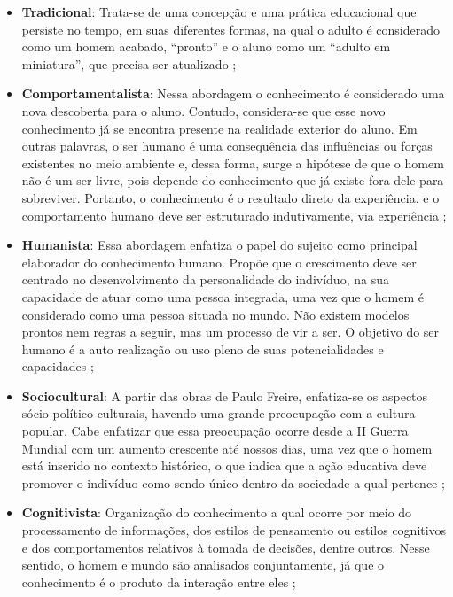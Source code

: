 \begin{itemize}
    \item \textbf{Tradicional}: Trata-se de uma concepção e uma prática educacional que persiste no tempo, em suas diferentes formas, na qual o adulto é considerado como um homem acabado, ``pronto'' e o aluno como um ``adulto em miniatura'', que precisa ser atualizado \cite{Cilli2017, Mizukami1986};
    \item \textbf{Comportamentalista}: Nessa abordagem o conhecimento é considerado uma nova descoberta para o aluno. Contudo, considera-se que esse novo conhecimento já se encontra presente na realidade exterior do aluno. Em outras palavras, o ser humano é uma consequência das influências ou forças existentes no meio ambiente e, dessa forma, surge a hipótese de que o homem não é um ser livre, pois depende do conhecimento que já existe fora dele para sobreviver. Portanto, o conhecimento é o resultado direto da experiência, e o comportamento humano deve ser estruturado indutivamente, via experiência \cite{Cilli2017, Mizukami1986};
    \item \textbf{Humanista}: Essa abordagem enfatiza o papel do sujeito como principal elaborador do conhecimento humano. Propõe que o crescimento deve ser centrado no desenvolvimento da personalidade do indivíduo, na sua capacidade de atuar como uma pessoa integrada, uma vez que o homem é considerado como uma pessoa situada no mundo. Não existem modelos prontos nem regras a seguir, mas um processo de vir a ser. O objetivo do ser humano é a auto realização ou uso pleno de suas potencialidades e capacidades \cite{Cilli2017, Mizukami1986};
    \item \textbf{Sociocultural}: A partir das obras de Paulo Freire, enfatiza-se os aspectos sócio-político-culturais, havendo uma grande preocupação com a cultura popular. Cabe enfatizar que essa preocupação ocorre desde a II Guerra Mundial com um aumento crescente até nossos dias, uma vez que o homem está inserido no contexto histórico, o que indica que a ação educativa deve promover o indivíduo como sendo único dentro da sociedade a qual pertence \cite{Cilli2017, Mizukami1986};
    \item \textbf{Cognitivista}: Organização do conhecimento a qual ocorre por meio do processamento de informações, dos estilos de pensamento ou estilos cognitivos e dos comportamentos relativos à tomada de decisões, dentre outros. Nesse sentido, o homem e mundo são analisados conjuntamente, já que o conhecimento é o produto da interação entre eles \cite{Cilli2017, Mizukami1986};

\end{itemize}
